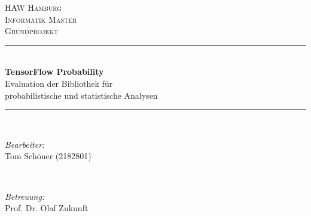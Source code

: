 \documentclass[12pt]{article}
\begin{document}
\begin{titlepage}

\newcommand{\HRule}{\rule{\linewidth}{0.5mm}} %

\begin{center}
 

\textsc{\LARGE HAW Hamburg}\\[0.5cm] %
\textsc{\LARGE Informatik Master}\\[1.5cm] %
\textsc{\Large Grundprojekt}\\[0.5cm] %


\HRule \\[0.4cm]

{ \LARGE \bfseries TensorFlow Probability}\\[0.5cm]
{ \large Evaluation der Bibliothek für}\\[0cm]
{ \large probabilistische und statistische Analysen}

\HRule \\[2.0cm]


\begin{minipage}{\textwidth}
\begin{flushleft} \large
\emph{Bearbeiter:}\\
Tom Schöner (2182801) \linebreak
\end{flushleft}
\end{minipage}
~
\begin{minipage}{\textwidth}
\begin{flushleft} \large
\emph{Betreuung:} \\
Prof. Dr. Olaf Zukunft
\end{flushleft}
\end{minipage}\\[4cm]


\end{center}
\end{titlepage}
\end{document}
